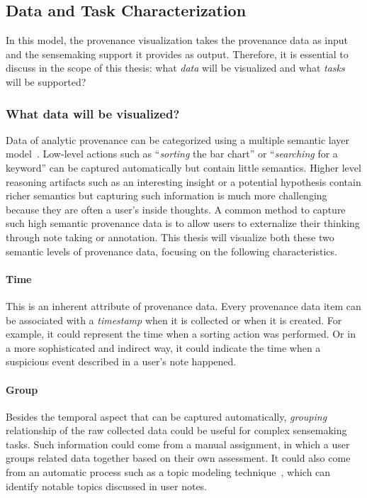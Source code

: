 \subsection{Data and Task Characterization}
In this model, the provenance visualization takes the provenance data as input and the sensemaking support it provides as output. Therefore, it is essential to discuss in the scope of this thesis: what \emph{data} will be visualized and what \emph{tasks} will be supported?

\subsubsection{What data will be visualized?}
Data of analytic provenance can be categorized using a multiple semantic layer model~\cite{Gotz2009}. Low-level actions such as ``\emph{sorting} the bar chart'' or ``\emph{searching} for a keyword'' can be captured automatically but contain little semantics. Higher level reasoning artifacts such as an interesting insight or a potential hypothesis contain richer semantics but capturing such information is much more challenging because they are often a user's inside thoughts. A common method to capture such high semantic provenance data is to allow users to externalize their thinking through note taking or annotation. This thesis will visualize both these two semantic levels of provenance data, focusing on the following characteristics.

\paragraph{Time}
This is an inherent attribute of provenance data. Every provenance data item can be associated with a \emph{timestamp} when it is collected or when it is created. For example, it could represent the time when a sorting action was performed. Or in a more sophisticated and indirect way, it could indicate the time when a suspicious event described in a user's note happened.

\paragraph{Group}
Besides the temporal aspect that can be captured automatically, \emph{grouping} relationship of the raw collected data could be useful for complex sensemaking tasks. Such information could come from a manual assignment, in which a user groups related data together based on their own assessment. It could also come from an automatic process such as a topic modeling technique~\cite{Blei2003}, which can identify notable topics discussed in user notes.

